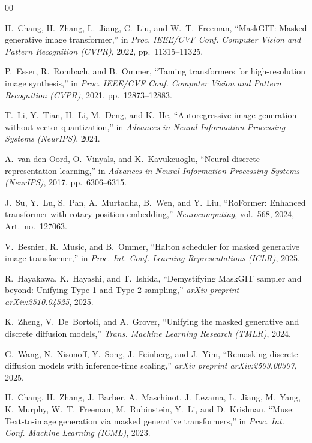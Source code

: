 \documentclass[conference]{IEEEtran}
\begin{document}
\begin{thebibliography}{00}

H.~Chang, H.~Zhang, L.~Jiang, C.~Liu, and W.~T.~Freeman, ``MaskGIT: Masked generative image transformer,'' in \emph{Proc. IEEE/CVF Conf. Computer Vision and Pattern Recognition (CVPR)}, 2022, pp.~11315--11325.

P.~Esser, R.~Rombach, and B.~Ommer, ``Taming transformers for high-resolution image synthesis,'' in \emph{Proc. IEEE/CVF Conf. Computer Vision and Pattern Recognition (CVPR)}, 2021, pp.~12873--12883.

T.~Li, Y.~Tian, H.~Li, M.~Deng, and K.~He, ``Autoregressive image generation without vector quantization,'' in \emph{Advances in Neural Information Processing Systems (NeurIPS)}, 2024.

A.~van den Oord, O.~Vinyals, and K.~Kavukcuoglu, ``Neural discrete representation learning,'' in \emph{Advances in Neural Information Processing Systems (NeurIPS)}, 2017, pp.~6306--6315.

J.~Su, Y.~Lu, S.~Pan, A.~Murtadha, B.~Wen, and Y.~Liu, ``RoFormer: Enhanced transformer with rotary position embedding,'' \emph{Neurocomputing}, vol.~568, 2024, Art.~no.~127063.

V.~Besnier, R.~Music, and B.~Ommer, ``Halton scheduler for masked generative image transformer,'' in \emph{Proc. Int. Conf. Learning Representations (ICLR)}, 2025.

R.~Hayakawa, K.~Hayashi, and T.~Ishida, ``Demystifying MaskGIT sampler and beyond: Unifying Type-1 and Type-2 sampling,'' \emph{arXiv preprint arXiv:2510.04525}, 2025.

K.~Zheng, V.~De~Bortoli, and A.~Grover, ``Unifying the masked generative and discrete diffusion models,'' \emph{Trans. Machine Learning Research (TMLR)}, 2024.

G.~Wang, N.~Nisonoff, Y.~Song, J.~Feinberg, and J.~Yim, ``Remasking discrete diffusion models with inference-time scaling,'' \emph{arXiv preprint arXiv:2503.00307}, 2025.

H.~Chang, H.~Zhang, J.~Barber, A.~Maschinot, J.~Lezama, L.~Jiang, M.~Yang, K.~Murphy, W.~T.~Freeman, M.~Rubinstein, Y.~Li, and D.~Krishnan, ``Muse: Text-to-image generation via masked generative transformers,'' in \emph{Proc. Int. Conf. Machine Learning (ICML)}, 2023.


\end{thebibliography}
\end{document}
